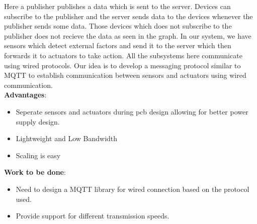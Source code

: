 \documentclass[a4paper,10pt]{book}
\newenvironment*{chapterenv}{}{}
\newcommand\tab[1][0.5cm]{\hspace*{#1}}
\begin{document}
\begin{appendices}
\begin{chapterenv}
    Here a publisher publishes a data which is sent to the server. Devices can subscribe to the publisher and the server sends data to the devices whenever the publisher sends some data. Those devices which does not subscribe to the publisher does not recieve the data as seen in the graph.
    \newline
    \tab In our system, we have sensors which detect external factors and send it to the server which then forwards it to actuators to take action. All the subsystems here communicate using wired protocols. Our idea is to develop a messaging protocol similar to MQTT to establish communication between sensors and actuators using wired communication.\\
    \textbf{Advantages}:
    \begin{itemize}
     \item Seperate sensors and actuators during pcb design allowing for better power supply design.
     \item Lightweight and Low Bandwidth
     \item Scaling is easy
    \end{itemize}
    \textbf{Work to be done}:
    \begin{itemize}
     \item Need to design a MQTT library for wired connection based on the protocol used.
     \item Provide support for different transmission speeds.
    \end{itemize}



\end{chapterenv}


\end{appendices}
\end{document}
